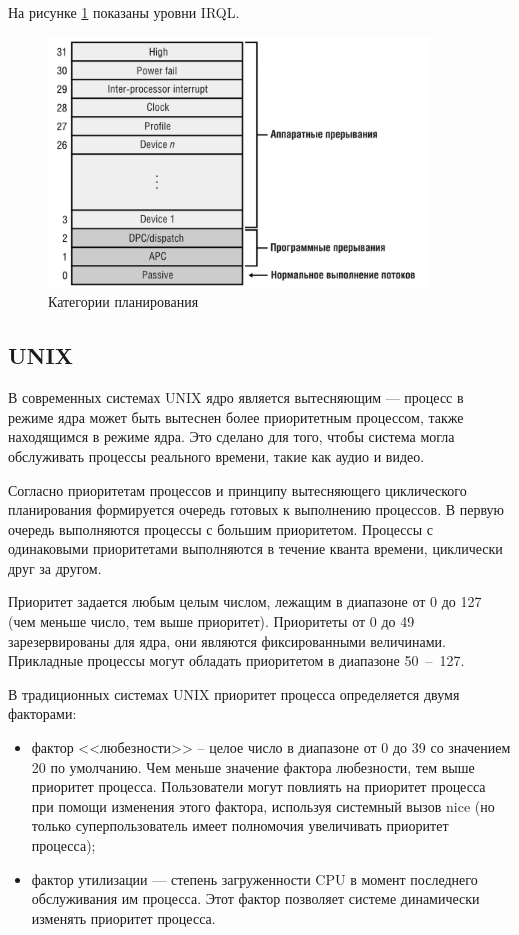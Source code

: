 \documentclass[a4paper,oneside,14pt]{extarticle}
\begin{document}
На рисунке \ref{img:7} показаны уровни IRQL. \clearpage
\begin{figure}[h]
	\centering
	\includegraphics[width=0.9\textwidth]{img/image.png}
    \caption{Категории планирования}
	\label{img:7}
\end{figure}






\subsection{UNIX}

В современных системах UNIX ядро является вытесняющим --- процесс в режиме ядра может быть вытеснен более приоритетным процессом, также находящимся в режиме ядра.
Это сделано для того, чтобы система могла обслуживать процессы реального времени, такие как  аудио и видео.

Согласно приоритетам процессов и принципу вытесняющего циклического планирования формируется очередь готовых к выполнению процессов.
В первую очередь выполняются процессы с большим приоритетом.
Процессы с одинаковыми приоритетами выполняются в течение кванта времени, циклически друг за другом.

Приоритет задается любым целым числом, лежащим в диапазоне от 0 до 127 (чем меньше число, тем выше приоритет).
Приоритеты от 0 до 49 зарезервированы для ядра, они являются фиксированными величинами.
Прикладные процессы могут обладать приоритетом в диапазоне 50~--~127.

В традиционных системах UNIX приоритет процесса определяется двумя факторами: 
\begin{itemize}
	\item фактор <<любезности>> – целое число в диапазоне от 0 до 39 со значением 20 по умолчанию. Чем меньше значение фактора любезности, тем выше приоритет процесса. Пользователи могут повлиять на приоритет процесса при помощи изменения этого фактора, используя системный вызов nice (но только суперпользователь имеет полномочия увеличивать приоритет процесса);
	\item фактор утилизации --- степень загруженности CPU в момент последнего обслуживания им процесса. Этот фактор позволяет системе динамически изменять приоритет процесса.
\end{itemize}
\end{document}
